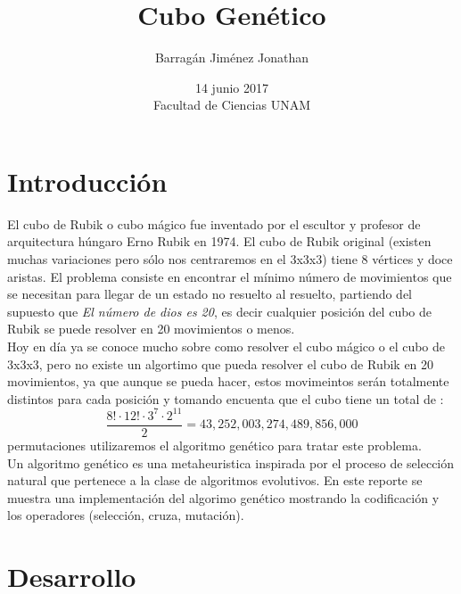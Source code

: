 \documentclass[oneside,10pt]{article}
\begin{document}
\author{Barragán Jim\'enez Jonathan}
\date{14 junio 2017\\ Facultad de Ciencias UNAM}
\title{Cubo Gen\'etico }
\maketitle


\section{Introducción}

El cubo de Rubik o cubo m\'agico fue inventado  por el escultor y profesor de arquitectura h\'ungaro Erno Rubik en 1974. El cubo de Rubik original (existen muchas variaciones pero s\'olo nos centraremos en el 3x3x3) tiene 8 v\'ertices y doce aristas. El problema consiste en encontrar el m\'inimo n\'umero de movimientos que se necesitan para llegar de un estado no resuelto al resuelto, partiendo del supuesto que  \textsl{El n\'umero de dios es 20}\cite{god20},  es decir cualquier posici\'on del cubo de Rubik se puede resolver en 20 movimientos o menos. \\ 

Hoy en d\'ia ya se conoce mucho sobre como resolver el cubo m\'agico o el cubo de 3x3x3, pero no existe un algortimo que pueda resolver el cubo de Rubik en 20 movimientos, ya que aunque se pueda hacer, estos movimeintos ser\'an totalmente distintos para cada posici\'on y tomando encuenta que el cubo tiene un total de :  \[ \frac{8! \cdot 12! \cdot 3^{7} \cdot 2^{11} }{2} = 43,252,003,274,489,856,000 \] permutaciones utilizaremos el algoritmo gen\'etico para tratar este problema.\\

Un algoritmo gen\'etico es una metaheuristica inspirada por el proceso de selecci\'on natural que pertenece a la clase de algoritmos evolutivos. En este reporte se muestra una implementaci\'on del algorimo gen\'etico mostrando la codificaci\'on y los operadores (selecci\'on, cruza, mutaci\'on). 

\newpage

\section{Desarrollo}
\end{document}
